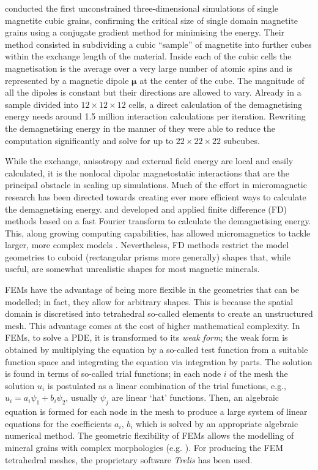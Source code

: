 \citet{Williams1989} conducted the first unconstrained three-dimensional simulations of single magnetite cubic grains, confirming the critical size of single domain magnetite grains using a conjugate gradient method for minimising the energy. Their method consisted in subdividing a cubic ``sample'' of magnetite into further cubes within the exchange length of the material. Inside each of the cubic cells the magnetisation is the average over a very large number of atomic spins and is represented by a magnetic dipole $\boldsymbol{\mu}$ at the center of the cube. The magnitude of all the dipoles is constant but their directions are allowed to vary. Already in a sample divided into $12\times 12\times 12$ cells, a direct calculation of the demagnetising energy needs around 1.5 million interaction calculations per iteration. Rewriting the demagnetising energy in the manner of \citet{Rhodes1954} they were able to reduce the computation significantly and solve for up to $22\times 22\times 22$ subcubes.\par

While the exchange, anisotropy and external field energy are local and easily calculated, it is the nonlocal dipolar magnetostatic interactions that are the principal obstacle in scaling up simulations. Much of the effort in micromagnetic research has been directed towards creating ever more efficient ways to calculate the demagnetising energy. \citet{Fabian1996} and \citet{Wright1997} developed and applied finite difference (FD) methods based on a fast Fourier transform to calculate the demagnetising energy. This, along growing computing capabilities, has allowed micromagnetics to tackle larger, more complex models \citep{Williams1998}. Nevertheless, FD methods restrict the model geometries to cuboid (rectangular prisms more generally) shapes that, while useful, are somewhat unrealistic shapes for most magnetic minerals.\par

FEMs have the advantage of being more flexible in the geometries that can be modelled; in fact, they allow for arbitrary shapes. This is because the spatial domain is discretised into tetrahedral so-called elements to create an unstructured mesh. This advantage comes at the cost of higher mathematical complexity. In FEMs, to solve a PDE, it is transformed to its \emph{weak form}; the weak form is obtained by multiplying the equation by a so-called test function from a suitable function space and integrating the equation via integration by parts. The solution is found in terms of so-called trial functions; in each node $i$ of the mesh the solution $u_i$ is postulated as a linear combination of the trial functions, e.g., $u_i=a_i\psi_1 + b_i\psi_2$, usually $\psi_j$ are linear `hat' functions. Then, an algebraic equation is formed for each node in the mesh to produce a large system of linear equations for the coefficients $a_i,\,b_i$ which is solved by an appropriate algebraic numerical method. The geometric flexibility of FEMs allows the modelling of mineral grains with complex morphologies (e.g. \citet{Williams2010}). For producing the FEM tetrahedral meshes, the proprietary software \emph{Trelis} has been used.\par

